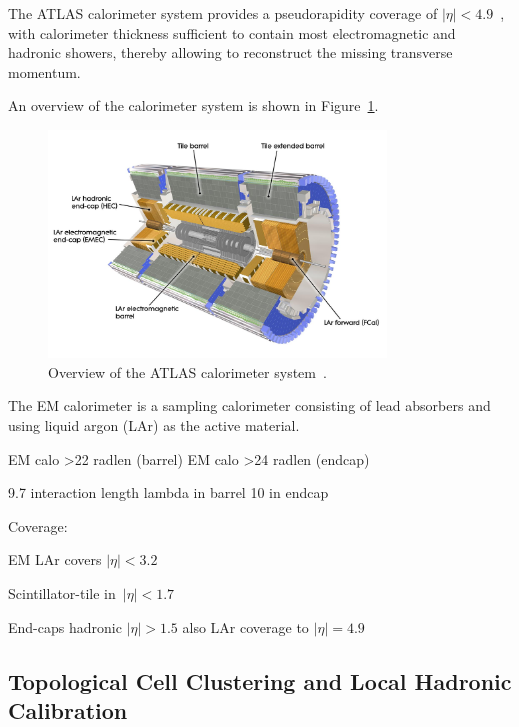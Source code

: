 The ATLAS calorimeter system provides a pseudorapidity coverage of
$|\eta| < 4.9$~\cite{atlas_detector}, with calorimeter thickness sufficient to
contain most electromagnetic and hadronic showers, thereby allowing to
reconstruct the missing transverse momentum.

An overview of the calorimeter system is shown in Figure~\ref{fig:atlas_calo}.

\begin{figure}[htb]
  \centering
  \includegraphics[width=0.8\textwidth]{./figures/atlas/calorimeter.jpg}
  \caption{Overview of the ATLAS calorimeter system~\cite{calo_fig}.}
  \label{fig:atlas_calo}
\end{figure}


The EM calorimeter is a sampling calorimeter consisting of lead absorbers and
using liquid argon (LAr) as the active material.





EM calo >22 radlen (barrel)
EM calo >24 radlen (endcap)

9.7 interaction length lambda in barrel
10 in endcap


Coverage:

EM LAr covers $|\eta|< 3.2$

Scintillator-tile in~$|\eta| < 1.7$

End-caps hadronic $|\eta| > 1.5$ also LAr coverage to $|\eta| = 4.9$



\subsection{Topological Cell Clustering and Local Hadronic Calibration}



